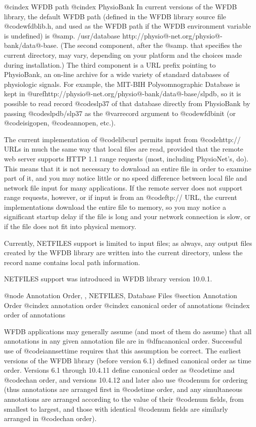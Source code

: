 {{{{{{{{{@cindex WFDB path
@cindex PhysioBank
In current versions of the WFDB library, the default WFDB path (defined in the
WFDB library source file @code{wfdblib.h}, and used as the WFDB path if the
WFDB environment variable is undefined) is @samp{. /usr/database
http://physio@-net.org/physio@-bank/data@-base}.  (The second component,
after the @samp{.} that specifies the current directory, may vary, depending on
your platform and the choices made during installation.)  The third component
is a URL prefix pointing to PhysioBank, an on-line archive for a wide variety
of standard databases of physiologic signals.
For example, the MIT-BIH Polysomnographic Database is kept in
@uref{http://physio@-net.org/physio@-bank/data@-base/slpdb}, so it is
possible to read record @code{slp37} of that database directly from PhysioBank
by passing @code{slpdb/slp37} as the @var{record} argument to @code{wfdbinit}
(or @code{isigopen}, @code{annopen}, etc.).

The current implementation of @code{libcurl} permits input from @code{http://}
URLs in much the same way that local files are read, provided that the remote
web server supports HTTP 1.1 range requests (most, including PhysioNet's, do).
This means that it is not necessary to download an entire file in order to
examine part of it, and you may notice little or no speed difference between
local file and network file input for many applications.  If the remote server
does not support range requests, however, or if input is from an @code{ftp://}
URL, the current implementations download the entire file to memory, so you may
notice a significant startup delay if the file is long and your network
connection is slow, or if the file does not fit into physical memory.

Currently, NETFILES support is limited to input files; as always, any output
files created by the WFDB library are written into the current directory,
unless the record name contains local path information.

NETFILES support was introduced in WFDB library version 10.0.1.

@node     Annotation Order, , NETFILES, Database Files
@section Annotation Order
@cindex annotation order
@cindex canonical order of annotations
@cindex order of annotations

WFDB applications may generally assume (and most of them do assume) that all
annotations in any given annotation file are in @dfn{canonical order}.
Successful use of @code{iannsettime} requires that this assumption be correct.
The earliest versions of the WFDB library (before version 6.1) defined
canonical order as time order.  Versions 6.1 through 10.4.11 define canonical
order as @code{time} and @code{chan} order, and versions 10.4.12 and later also
use @code{num} for ordering (thus annotations are arranged first in @code{time}
order, and any simultaneous annotations are arranged according to the value of
their @code{num} fields, from smallest to largest, and those with identical
@code{num} fields are similarly arranged in @code{chan} order).

}}}}}}}}}
